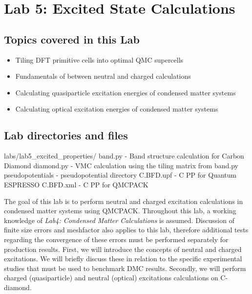 \chapter{Lab 5: Excited State Calculations}
\label{chap:excited}


\section{Topics covered in this Lab}
\begin{itemize}
	\item{Tiling DFT primitive cells into optimal QMC supercells}
	\item{Fundamentals of  between neutral and charged calculations}
	\item{Calculating quasiparticle excitation energies of condensed matter systems}
	\item{Calculating optical excitation energies of condensed matter systems}
\end{itemize}

\section{Lab directories and files}

\begin{shade}
labs/lab5_excited_properties/
    band.py           - Band structure calculation for Carbon Diamond
    diamond.py        - VMC calculation using the tiling matrix from band.py
pseudopotentials      - pseudopotential directory
	C.BFD.upf         - C PP for Quantum ESPRESSO
	C.BFD.xml         - C PP for QMCPACK
\end{shade}

The goal of this lab is to perform neutral and charged excitation calculations in condensed matter systems using QMCPACK. 
Throughout this lab, a working knowledge of \textit{Lab4: Condensed Matter Calculations} is assumed. 
Discussion of finite size errors and meshfactor also applies to this lab, therefore additional tests regarding the convergence of these errors must be performed separately for production results. 
First, we will introduce the concepts of neutral and charged excitations. 
We will briefly discuss these in relation to the specific experimental studies that must be used to benchmark DMC results. 
Secondly, we will perform charged (quasiparticle) and neutral (optical) excitations calculations on C-diamond.

